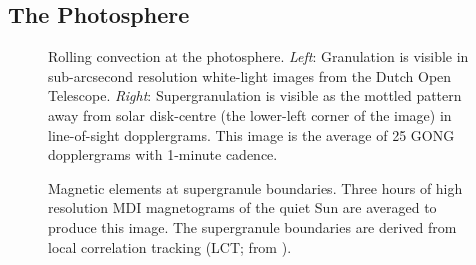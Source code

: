 \subsection{The Photosphere}\label{intro:photosphere}

\begin{figure}[!t]
\caption[Rolling convection at the photosphere.]{Rolling convection at the photosphere. \emph{Left}: Granulation is visible in sub-arcsecond resolution white-light images from the Dutch Open Telescope. \emph{Right}: Supergranulation is visible as the mottled pattern away from solar disk-centre (the lower-left corner of the image) in line-of-sight dopplergrams. This image is the average of 25 GONG dopplergrams with 1-minute cadence.} %
\label{fig:granulation}
\end{figure}

\begin{figure}[!t]
\caption[Magnetic elements at supergranule boundaries.]{Magnetic elements at supergranule boundaries. Three hours of high resolution MDI magnetograms of the quiet Sun are averaged to produce this image. The supergranule boundaries are derived from local correlation tracking (LCT; from \citealp{Schrijver:1997b}).}
\label{fig:maggranboundary}
\end{figure}

